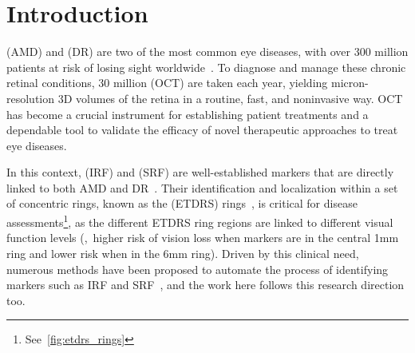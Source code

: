 \section{Introduction}
\label{sec:oct_introduction}
 (AMD) and  (DR) are two of the most common eye diseases, with over 300 million patients at risk of losing sight worldwide~. To diagnose and manage these chronic retinal conditions, 30 million  (OCT) are taken each year, yielding micron-resolution 3D volumes of the retina in a routine, fast, and noninvasive way. OCT has become a crucial instrument for establishing patient treatments and a dependable tool to validate the efficacy of novel therapeutic approaches to treat eye diseases.

In this context,  (IRF) and  (SRF) are well-established markers that are directly linked to both AMD and DR~. Their identification and localization within a set of concentric rings, known as the  (ETDRS) rings~, is critical for disease assessments\footnote{See~\cref{fig:etdrs_rings}}, as the different ETDRS ring regions are linked to different visual function levels (\ie,~higher risk of vision loss when markers are in the central 1mm ring and lower risk when in the 6mm ring). Driven by this clinical need, numerous methods have been proposed to automate the process of identifying markers such as IRF and SRF~, and the work here follows this research direction too.



